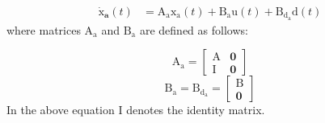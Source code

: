 \documentclass[conference]{IEEEtran}
\begin{document}
\begin{equation}\label{systemlqidg}
	\begin{split}
		\boldsymbol{\dot{\mathrm{x}}_a}(t) &= \boldsymbol{\mathrm{A_ax_a}}(t) + \boldsymbol{\mathrm{B_{{a}}u}}(t) + \boldsymbol{\mathrm{B_{{d_a}}d}}(t)%
	\end{split}
\end{equation}
where matrices $\boldsymbol{\mathrm{A_a}}$ and $\boldsymbol{\mathrm{B_a}}$ are defined as follows:

\begin{equation}
	\boldsymbol{\mathrm{A_a}} = \begin{bmatrix}
		\boldsymbol{\mathrm{A}} & \boldsymbol{0}\\
		\boldsymbol{\mathrm{I}} & \boldsymbol{0}
	\end{bmatrix}
\end{equation}
\begin{equation}
	\boldsymbol{\mathrm{B_a}} = \boldsymbol{\mathrm{B_{{d_a}}}} = \begin{bmatrix}
		\boldsymbol{\mathrm{B}}\\
		\boldsymbol{0}
	\end{bmatrix}
\end{equation}
In the above equation $\boldsymbol{\mathrm{I}}$ denotes the identity matrix.
\end{document}
